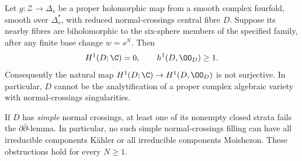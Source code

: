\begin{theorem}\label{push:src:B.4.3}
Let $g:\mathcal Z\to\Delta_s$ be a proper holomorphic map from a
smooth complex fourfold, smooth over $\Delta_s^*$, with reduced
normal-crossings central fibre $D$. Suppose its nearby fibres are
biholomorphic to the six-sphere members of the specified family,
after any finite base change $w=s^N$. Then
\[
 H^1(D;\C)=0,\qquad h^1(D,\OO_D)\geq1.
\]
Consequently the natural map
$H^1(D;\C)\to H^1(D,\OO_D)$ is not surjective. In particular,
$D$ cannot be the analytification of a proper complex algebraic
variety with normal-crossings singularities.

If $D$ has \emph{simple} normal crossings, at least one of its
nonempty closed strata fails the $\partial\bar\partial$-lemma.
In particular, no such simple normal-crossings filling can have
all irreducible components K\"ahler or all irreducible components
Moishezon. These obstructions hold for every $N\geq1$.
\end{theorem}
